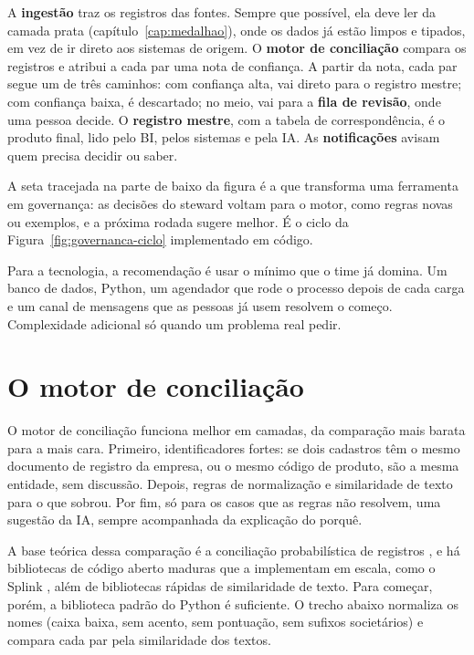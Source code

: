 A \textbf{ingestão} traz os registros das fontes. Sempre que possível, ela deve ler da
camada prata (capítulo~\ref{cap:medalhao}), onde os dados já estão limpos e tipados, em vez
de ir direto aos sistemas de origem. O \textbf{motor de conciliação} compara os registros e
atribui a cada par uma nota de confiança. A partir da nota, cada par segue um de três
caminhos: com confiança alta, vai direto para o registro mestre; com confiança baixa, é
descartado; no meio, vai para a \textbf{fila de revisão}, onde uma pessoa decide. O
\textbf{registro mestre}, com a tabela de correspondência, é o produto final, lido pelo BI,
pelos sistemas e pela IA. As \textbf{notificações} avisam quem precisa decidir ou saber.

A seta tracejada na parte de baixo da figura é a que transforma uma ferramenta em governança:
as decisões do steward voltam para o motor, como regras novas ou exemplos, e a próxima
rodada sugere melhor. É o ciclo da Figura~\ref{fig:governanca-ciclo} implementado em
código.

Para a tecnologia, a recomendação é usar o mínimo que o time já domina. Um banco de dados,
Python, um agendador que rode o processo depois de cada carga e um canal de mensagens que as
pessoas já usem resolvem o começo. Complexidade adicional só quando um problema real pedir.

\section{O motor de conciliação}
\label{sec:motor-conciliacao}

O motor de conciliação funciona melhor em camadas, da comparação mais barata para a mais
cara. Primeiro, identificadores fortes: se dois cadastros têm o mesmo documento de
registro da empresa, ou o mesmo código de produto, são a mesma entidade, sem discussão.
Depois, regras de normalização e similaridade de texto para o que sobrou. Por fim, só para os
casos que as regras não resolvem, uma sugestão da IA, sempre acompanhada da explicação do
porquê.

A base teórica dessa comparação é a conciliação probabilística de registros
\parencite{fellegi1969,christen2012}, e há bibliotecas de código aberto maduras que a
implementam em escala, como o Splink \parencite{linacre2022}, além de bibliotecas rápidas de
similaridade de texto. Para começar, porém, a biblioteca padrão do Python é suficiente. O
trecho abaixo normaliza os nomes (caixa baixa, sem acento, sem pontuação, sem sufixos
societários) e compara cada par pela similaridade dos textos.

